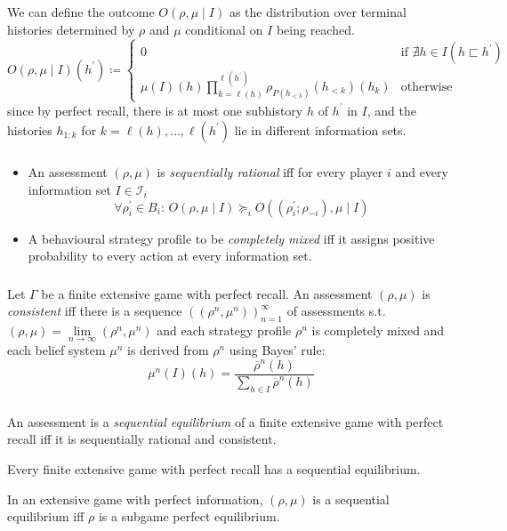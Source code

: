 \documentclass[UTF8,11pt,colorlinks,compress,openany]{beamer}%
\begin{document}
\begin{frame}\frametitle{}
We can define the outcome $O(\rho,\mu\mid I)$ as the distribution over terminal histories determined by $\rho$ and $\mu$ conditional on $I$ being reached.
\[
O(\rho,\mu\mid I)(h^\prime)\coloneqq 
\begin{cases}
0 &\text{if $\nexists h\in I\left(h\sqsubset h^\prime\right)$}\\
\mu(I)(h)\prod\limits_{k=\ell(h)}^{\ell(h^\prime)}\rho_{P(h_{<k})}(h_{<k})(h_k) &\text{otherwise}
\end{cases}
\]
since by perfect recall, there is at most one subhistory $h$ of $h^\prime$ in $I$, and the histories $h_{1:k}$ for $k=\ell(h),\ldots,\ell(h^\prime)$ lie in different information sets.
\end{frame}

\begin{frame}\frametitle{}
\begin{itemize}
	\item An assessment $(\rho,\mu)$ is \emph{sequentially rational} iff for every player $i$ and every information set $I\in\mathcal{I}_i$
\[\forall \rho_i^\prime\in B_i:\, O(\rho,\mu\mid I)\succcurlyeq_i O((\rho_i^\prime;\rho_{-i}),\mu\mid I)\]
	\item A behavioural strategy profile to be \emph{\emph{completely mixed}} iff it assigns positive probability to every action at every information set.
\end{itemize}
\end{frame}

\begin{frame}\frametitle{}
\begin{definition}
	Let $\Gamma$ be a finite extensive game with perfect recall. An assessment $(\rho,\mu)$ is \emph{consistent} iff there is a sequence $((\rho^n,\mu^n))_{n=1}^\infty$ of assessments s.t. $(\rho,\mu)=\lim\limits_{n\to\infty}(\rho^n,\mu^n)$ and each strategy profile $\rho^n$ is completely mixed and each belief system $\mu^n$ is derived from $\rho^n$ using Bayes' rule: \[\mu^n(I)(h)=\dfrac{\overline{\rho}^n(h)}{\sum\limits_{h\in I}\overline{\rho}^n(h)}\]
\end{definition}
\end{frame}

\begin{frame}\frametitle{}
\begin{definition}
	An assessment is a \emph{sequential equilibrium} of a finite extensive game with perfect recall iff it is sequentially rational and consistent.
\end{definition}
\begin{theorem}
	Every finite extensive game with perfect recall has a sequential equilibrium.
\end{theorem}
\begin{theorem}
	In an extensive game with perfect information, $(\rho,\mu)$ is a sequential equilibrium iff $\rho$ is a subgame perfect equilibrium.
\end{theorem}
\end{frame}
\end{document}
